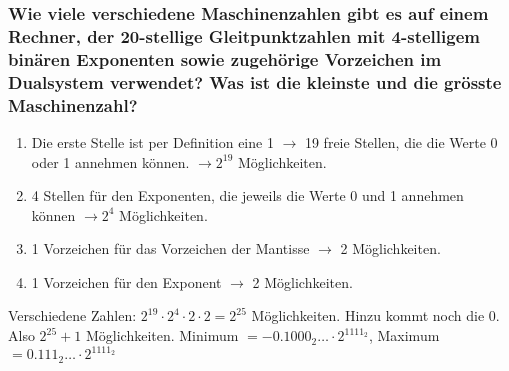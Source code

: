 \subsubsection{Wie viele verschiedene Maschinenzahlen gibt es auf einem Rechner, der 20-stellige Gleitpunktzahlen mit 4-stelligem binären Exponenten
sowie zugehörige Vorzeichen im Dualsystem verwendet? Was ist die kleinste und die grösste Maschinenzahl?}
\begin{enumerate}
 \item Die erste Stelle ist per Definition eine 1 $\rightarrow$ 19 freie Stellen, die die Werte 0 oder 1 annehmen können. $\rightarrow 2^{19}$ Möglichkeiten.
 \item 4 Stellen für den Exponenten, die jeweils die Werte 0 und 1 annehmen können $\rightarrow 2^4$ Möglichkeiten.
 \item 1 Vorzeichen für das Vorzeichen der Mantisse $\rightarrow$ 2 Möglichkeiten.
 \item 1 Vorzeichen für den Exponent $\rightarrow$ 2 Möglichkeiten.
\end{enumerate}
Verschiedene Zahlen: $2^{19} \cdot 2^4 \cdot 2 \cdot 2 = 2^{25}$ Möglichkeiten. Hinzu kommt noch die 0. Also $2^{25} + 1$ Möglichkeiten.
Minimum $= - 0.1000_2\dots \cdot 2^{1111_2}$, Maximum $= 0.111_2\dots \cdot 2^{1111_2}$ 
